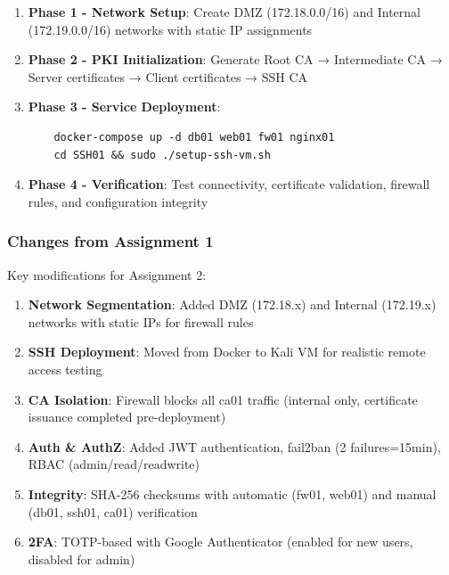 \begin{enumerate}
    \item \textbf{Phase 1 - Network Setup}: Create DMZ (172.18.0.0/16) and Internal (172.19.0.0/16) networks with static IP assignments
    
    \item \textbf{Phase 2 - PKI Initialization}: Generate Root CA → Intermediate CA → Server certificates → Client certificates → SSH CA
    
    \item \textbf{Phase 3 - Service Deployment}: 
    \begin{verbatim}
    docker-compose up -d db01 web01 fw01 nginx01
    cd SSH01 && sudo ./setup-ssh-vm.sh
    \end{verbatim}
    
    \item \textbf{Phase 4 - Verification}: Test connectivity, certificate validation, firewall rules, and configuration integrity
\end{enumerate}

\subsubsection{Changes from Assignment 1}

Key modifications for Assignment 2:

\begin{enumerate}
    \item \textbf{Network Segmentation}: Added DMZ (172.18.x) and Internal (172.19.x) networks with static IPs for firewall rules
    
    \item \textbf{SSH Deployment}: Moved from Docker to Kali VM for realistic remote access testing
    
    \item \textbf{CA Isolation}: Firewall blocks all ca01 traffic (internal only, certificate issuance completed pre-deployment)
    
    \item \textbf{Auth \& AuthZ}: Added JWT authentication, fail2ban (2 failures=15min), RBAC (admin/read/readwrite)
    
    \item \textbf{Integrity}: SHA-256 checksums with automatic (fw01, web01) and manual (db01, ssh01, ca01) verification
    
    \item \textbf{2FA}: TOTP-based with Google Authenticator (enabled for new users, disabled for admin)
\end{enumerate}

